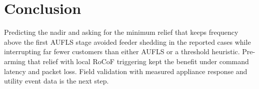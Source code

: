 \documentclass[conference]{IEEEtran}
\begin{document}
\section{Conclusion}
Predicting the nadir and asking for the minimum relief that keeps frequency above the first AUFLS stage avoided feeder shedding in the reported cases while interrupting far fewer customers than either AUFLS or a threshold heuristic. Pre-arming that relief with local RoCoF triggering kept the benefit under command latency and packet loss. Field validation with measured appliance response and utility event data is the next step.



\end{document}
